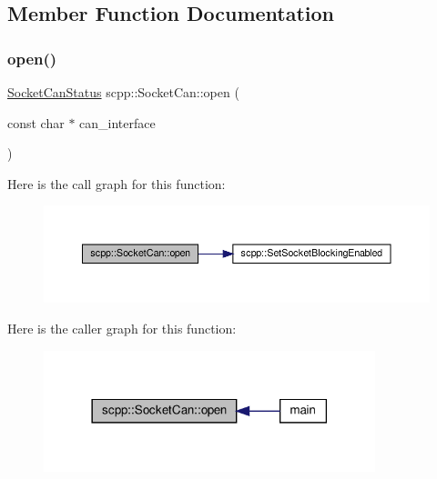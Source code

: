 \subsection{Member Function Documentation}
\mbox{\label{classscpp_1_1SocketCan_aa1ff7b90193c5beee33947a59c2e63bc}} 
\subsubsection{\texorpdfstring{open()}{open()}}
{\footnotesize\ttfamily \hyperlink{namespacescpp_abc60b9ed5f90c311397500d39ff15ef2}{Socket\+Can\+Status} scpp\+::\+Socket\+Can\+::open (\begin{DoxyParamCaption}\item[{const char $\ast$}]{can\+\_\+interface }\end{DoxyParamCaption})}

Here is the call graph for this function\+:
\nopagebreak
\begin{figure}[H]
\begin{center}
\leavevmode
\includegraphics[width=350pt]{classscpp_1_1SocketCan_aa1ff7b90193c5beee33947a59c2e63bc_cgraph}
\end{center}
\end{figure}
Here is the caller graph for this function\+:
\nopagebreak
\begin{figure}[H]
\begin{center}
\leavevmode
\includegraphics[width=273pt]{classscpp_1_1SocketCan_aa1ff7b90193c5beee33947a59c2e63bc_icgraph}
\end{center}
\end{figure}
\mbox{\label{classscpp_1_1SocketCan_a474c925b2fb96b40a5cc549ba8134a44}} 
